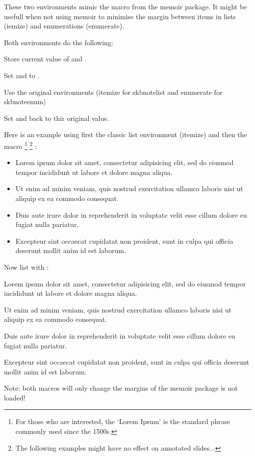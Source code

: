 
\DescribeMacro{\skbnotelist}
\DescribeMacro{\skbnoteenum}
These two environments mimic the macro \cmd{\tightlists} from the memoir package. It might be 
usefull when not using memoir to minimise the margin between items in lists (iemize) and enumerations
(enumerate).

Both environments do the following:
\begin{skbnotelist}
  \item Store current value of \cmd{\parskip} and \cmd{\itemsep}.
  \item Set \cmd{\parskip} and \cmd{\itemsep} to \skbem[code]{0cm}.
  \item Use the original environments (itemize for skbnotelist and enumerate for skbnoteenum)
  \item Set \cmd{\parskip} and \cmd{\itemsep} back to thir original value.
\end{skbnotelist}

Here is an example using first the classic list environment (itemize) and then the  macro
\footnote{For those who are interested, the `Lorem Ipsum' is the standard phrase commonly used since the 1500s.}
\footnote{The following examples might have no effect on annotated slides...}
:
\setlength{\parskip}{4.5pt}
\setlength{\itemsep}{4.5pt}
\begin{itemize}
  \item Lorem ipsum dolor sit amet, consectetur adipisicing elit, sed do eiusmod tempor incididunt ut labore et dolore magna aliqua.
  \item Ut enim ad minim veniam, quis nostrud exercitation ullamco laboris nisi ut aliquip ex ea commodo consequat.
  \item Duis aute irure dolor in reprehenderit in voluptate velit esse cillum dolore eu fugiat nulla pariatur.
  \item Excepteur sint occaecat cupidatat non proident, sunt in culpa qui officia deserunt mollit anim id est laborum.
\end{itemize}

\noindent Now list with \cmd{\skbnotelist}:
\begin{skbnotelist}
  \item Lorem ipsum dolor sit amet, consectetur adipisicing elit, sed do eiusmod tempor incididunt ut labore et dolore magna aliqua.
  \item Ut enim ad minim veniam, quis nostrud exercitation ullamco laboris nisi ut aliquip ex ea commodo consequat.
  \item Duis aute irure dolor in reprehenderit in voluptate velit esse cillum dolore eu fugiat nulla pariatur.
  \item Excepteur sint occaecat cupidatat non proident, sunt in culpa qui officia deserunt mollit anim id est laborum.
\end{skbnotelist}

Note: both macros will only change the margins of the memoir package is not loaded!